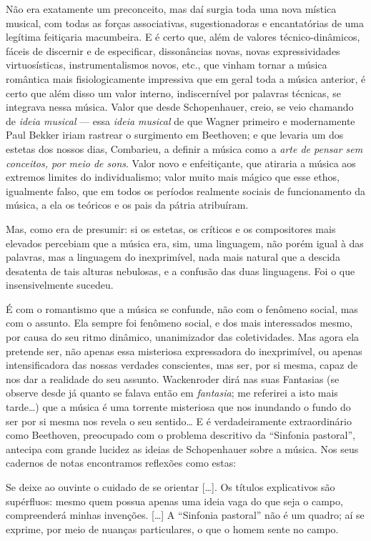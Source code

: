 Não era exatamente um preconceito, mas daí surgia toda uma nova mística
musical, com todas as forças associativas, sugestionadoras e
encantatórias de uma legítima feitiçaria macumbeira. E é certo que, além
de valores técnico-dinâmicos, fáceis de discernir e de especificar,
dissonâncias novas, novas expressividades virtuosísticas,
instrumentalismos novos, etc., que vinham tornar a música romântica mais
fisiologicamente impressiva que em geral toda a música anterior, é certo
que além disso um valor interno, indiscernível por palavras técnicas, se
integrava nessa música. Valor que desde Schopenhauer, creio, se veio
chamando de \textit{ideia musical} --- essa \textit{ideia musical} de que Wagner
primeiro e modernamente Paul Bekker iriam rastrear o surgimento em
Beethoven; e que levaria um dos estetas dos nossos dias, Combarieu, a
definir a música como a \textit{arte de pensar sem conceitos, por meio de
sons}. Valor novo e enfeitiçante, que atiraria a música aos extremos
limites do individualismo; valor muito mais mágico que esse ethos,
igualmente falso, que em todos os períodos realmente sociais de
funcionamento da música, a ela os teóricos e os pais da pátria
atribuíram.

Mas, como era de presumir: si os estetas, os críticos e os compositores
mais elevados percebiam que a música era, sim, uma linguagem, não porém
igual à das palavras, mas a linguagem do inexprimível, nada mais natural
que a descida desatenta de tais alturas nebulosas, e a confusão das duas
linguagens. Foi o que insensivelmente sucedeu.

É com o romantismo que a música se confunde, não com o fenômeno social,
mas com o assunto. Ela sempre foi fenômeno social, e dos mais
interessados mesmo, por causa do seu ritmo dinâmico, unanimizador das
coletividades. Mas agora ela pretende ser, não apenas essa misteriosa
expressadora do inexprimível, ou apenas intensificadora das nossas
verdades conscientes, mas ser, por si mesma, capaz de nos dar a
realidade do seu assunto. Wackenroder dirá nas suas Fantasias (se
observe desde já quanto se falava então em \textit{fantasia}; me referirei a
isto mais tarde\ldots{}) que a música é uma torrente misteriosa que nos
inundando o fundo do ser por si mesma nos revela o seu sentido\ldots{} E é
verdadeiramente extraordinário como Beethoven, preocupado com o problema
descritivo da ``Sinfonia pastoral'', antecipa com grande lucidez as
ideias de Schopenhauer sobre a música. Nos seus cadernos de notas
encontramos reflexões como estas:

Se deixe ao ouvinte o cuidado de se orientar {[}\ldots{}{]}. Os títulos
explicativos são supérfluos: mesmo quem possua apenas uma ideia vaga do
que seja o campo, compreenderá minhas invenções. {[}\ldots{}{]} A ``Sinfonia
pastoral'' não é um quadro; aí se exprime, por meio de nuanças
particulares, o que o homem sente no campo.

